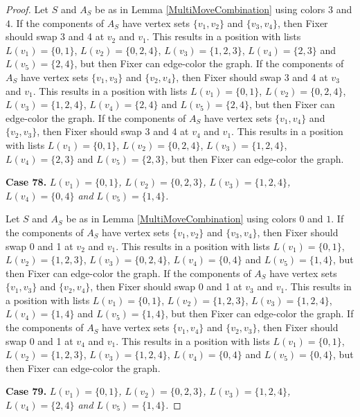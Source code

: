 \documentclass[12pt]{amsart}
\theoremstyle{plain}
\theoremstyle{definition}
\theoremstyle{remark}
\begin{document}
\begin{proof}
Let $S$ and $A_S$ be as in Lemma \ref{MultiMoveCombination} using colors $3$ and $4$. If the components of $A_S$ have vertex sets $\{v_1, v_2\}$ and $\{v_3, v_4\}$, then Fixer should swap 3 and 4 at $v_2$ and $v_1$. This results in a position with lists $L(v_1) = \{0, 1\}$, $L(v_2) = \{0, 2, 4\}$, $L(v_3) = \{1, 2, 3\}$, $L(v_4) = \{2, 3\}$ and $L(v_5) = \{2, 4\}$, but then Fixer can edge-color the graph.
If the components of $A_S$ have vertex sets $\{v_1, v_3\}$ and $\{v_2, v_4\}$, then Fixer should swap 3 and 4 at $v_3$ and $v_1$. This results in a position with lists $L(v_1) = \{0, 1\}$, $L(v_2) = \{0, 2, 4\}$, $L(v_3) = \{1, 2, 4\}$, $L(v_4) = \{2, 4\}$ and $L(v_5) = \{2, 4\}$, but then Fixer can edge-color the graph.
If the components of $A_S$ have vertex sets $\{v_1, v_4\}$ and $\{v_2, v_3\}$, then Fixer should swap 3 and 4 at $v_4$ and $v_1$. This results in a position with lists $L(v_1) = \{0, 1\}$, $L(v_2) = \{0, 2, 4\}$, $L(v_3) = \{1, 2, 4\}$, $L(v_4) = \{2, 3\}$ and $L(v_5) = \{2, 3\}$, but then Fixer can edge-color the graph.

\noindent\textbf{Case 78.  }\textit{$L(v_1) = \{0, 1\}$, $L(v_2) = \{0, 2, 3\}$, $L(v_3) = \{1, 2, 4\}$, $L(v_4) = \{0, 4\}$ and $L(v_5) = \{1, 4\}$.}

Let $S$ and $A_S$ be as in Lemma \ref{MultiMoveCombination} using colors $0$ and $1$. If the components of $A_S$ have vertex sets $\{v_1, v_2\}$ and $\{v_3, v_4\}$, then Fixer should swap 0 and 1 at $v_2$ and $v_1$. This results in a position with lists $L(v_1) = \{0, 1\}$, $L(v_2) = \{1, 2, 3\}$, $L(v_3) = \{0, 2, 4\}$, $L(v_4) = \{0, 4\}$ and $L(v_5) = \{1, 4\}$, but then Fixer can edge-color the graph.
If the components of $A_S$ have vertex sets $\{v_1, v_3\}$ and $\{v_2, v_4\}$, then Fixer should swap 0 and 1 at $v_3$ and $v_1$. This results in a position with lists $L(v_1) = \{0, 1\}$, $L(v_2) = \{1, 2, 3\}$, $L(v_3) = \{1, 2, 4\}$, $L(v_4) = \{1, 4\}$ and $L(v_5) = \{1, 4\}$, but then Fixer can edge-color the graph.
If the components of $A_S$ have vertex sets $\{v_1, v_4\}$ and $\{v_2, v_3\}$, then Fixer should swap 0 and 1 at $v_4$ and $v_1$. This results in a position with lists $L(v_1) = \{0, 1\}$, $L(v_2) = \{1, 2, 3\}$, $L(v_3) = \{1, 2, 4\}$, $L(v_4) = \{0, 4\}$ and $L(v_5) = \{0, 4\}$, but then Fixer can edge-color the graph.

\noindent\textbf{Case 79.  }\textit{$L(v_1) = \{0, 1\}$, $L(v_2) = \{0, 2, 3\}$, $L(v_3) = \{1, 2, 4\}$, $L(v_4) = \{2, 4\}$ and $L(v_5) = \{1, 4\}$.}


\end{proof}
\end{document}
